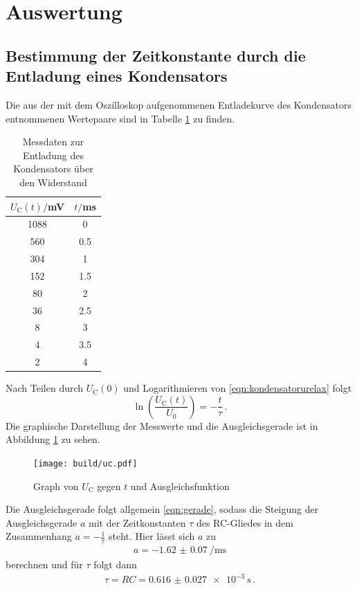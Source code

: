 \section{Auswertung}
\label{sec:Auswertung}
\subsection{Bestimmung der Zeitkonstante durch die Entladung eines Kondensators}
Die aus der mit dem Oszilloskop aufgenommenen Entladekurve des Kondensators
entnommenen Wertepaare sind in Tabelle \ref{tab:entladung} zu finden.

\begin{table}
\centering
\caption{Messdaten zur Entladung des Kondensators über den Widerstand}
\label{tab:entladung}
\begin{tabular}{c c}
\toprule
$U_\text{C}(t)/$mV & $t/$ms \\
\midrule
1088 &  0   \\
 560 &  0.5 \\
 304 &  1   \\
 152 &  1.5 \\
 80  &  2   \\
 36  &  2.5 \\
  8  &  3   \\
  4  &  3.5 \\
  2  &  4   \\
\bottomrule
\end{tabular}
\end{table}
Nach Teilen durch $U_\text{C}(0)$ und Logarithmieren von \eqref{eqn:kondensatorurelax} folgt
\begin{equation}
  \ln{\left(\frac{U_\mathrm{C}(t)}{U_0}\right)} = -\frac{t}{\tau}\,.
\end{equation}
Die graphische Darstellung der Messwerte und die Ausgleichsgerade ist in Abbildung \ref{fig:entladung}
zu sehen.
\begin{figure}
  \centering
  \texttt{[image: build/uc.pdf]}
  \caption{Graph von $U_\text{C}$ gegen $t$ und Ausgleichsfunktion}
  \label{fig:entladung}
\end{figure}
Die Ausgleichsgerade folgt allgemein \eqref{eqn:gerade}, sodass die Steigung der
Ausgleichsgerade $a$ mit der Zeitkonstanten $\tau$ des RC-Gliedes in dem Zusammenhang
$a = -\frac{1}{\tau}$ steht. Hier lässt sich $a$ zu
\begin{align}
  a = \SI{-1.62(007)}{\per\milli\second}
\end{align}
berechnen und für $\tau$ folgt dann
\begin{align}
\tau = RC = \SI{0.616(0027)e-3}{\second}\,.
\end{align}
